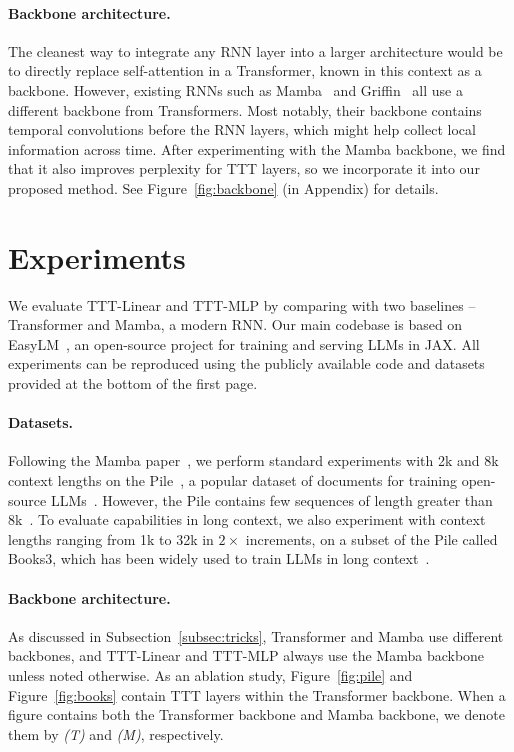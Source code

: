 \documentclass{article}
\begin{document}
\paragraph{Backbone architecture.}
The cleanest way to integrate any RNN layer into a larger architecture would be to directly replace self-attention in a Transformer, known in this context as a backbone. 
However, existing RNNs such as Mamba~\cite{gu2023mamba} and Griffin~\cite{de2024griffin} all use a different backbone from Transformers.
Most notably, their backbone contains temporal convolutions before the RNN layers, which might help collect local information across time.
After experimenting with the Mamba backbone, we find that it also improves perplexity for TTT layers, so we incorporate it into our proposed method.
See Figure~\ref{fig:backbone} (in Appendix) for details.

\section{Experiments}
\label{sec:results}

We evaluate TTT-Linear and TTT-MLP by comparing with two baselines 
-- Transformer and Mamba, a modern RNN.
Our main codebase is based on EasyLM~\cite{geng2023easylm}, an open-source project for training and serving LLMs in JAX.
All experiments can be reproduced using the publicly available code and datasets provided at the bottom of the first page.

\paragraph{Datasets.}
Following the Mamba paper~\cite{gu2023mamba}, we perform standard experiments with 2k and 8k context lengths on the Pile~\cite{gao2020pile}, a popular dataset of documents for training open-source LLMs~\cite{black2022gpt}. 
However, the Pile contains few sequences of length greater than 8k~\cite{devries2023contextlength}.
To evaluate capabilities in long context, we also experiment with context lengths ranging from 1k to 32k in $2\times$ increments, on a subset of the Pile called Books3, which has been widely used to train LLMs in long context~\cite{liu2024world, authorsguild2023}.

\paragraph{Backbone architecture.}
As discussed in Subsection~\ref{subsec:tricks}, Transformer and Mamba use different backbones, and TTT-Linear and TTT-MLP always use the Mamba backbone unless noted otherwise.
As an ablation study, Figure~\ref{fig:pile} and Figure~\ref{fig:books} contain TTT layers within the Transformer backbone.
When a figure contains both the Transformer backbone and Mamba backbone, we denote them by \emph{(T)} and \emph{(M)}, respectively.
\end{document}
